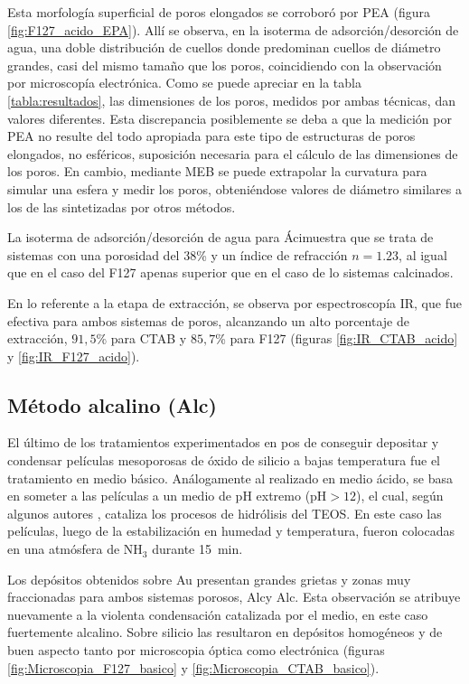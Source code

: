 		 Esta morfología superficial de poros elongados se corroboró por PEA (figura \ref{fig:F127_acido_EPA}). Allí se observa, en la isoterma de adsorción/desorción de agua, una doble distribución de cuellos donde predominan cuellos de diámetro grandes, casi del mismo tamaño que los poros, coincidiendo con la observación por microscopía electrónica.
		 Como se puede apreciar en la tabla \ref{tabla:resultados}, las dimensiones de los poros, medidos por ambas técnicas, dan valores diferentes. Esta discrepancia posiblemente se deba a que la medición por PEA no resulte del todo apropiada para este tipo de estructuras de poros elongados, no esféricos, suposición necesaria para el cálculo de las dimensiones de los poros. En cambio, mediante MEB se puede extrapolar la curvatura para simular una esfera y medir los poros, obteniéndose valores de diámetro similares a los de las \pdmF\space sintetizadas por otros métodos.

		 La isoterma de adsorción/desorción de agua para Áci\pdmC\space muestra que se trata de sistemas con una porosidad del 38\% y un índice de refracción $n=1.23$, al igual que en el caso del F127 apenas superior que en el caso de lo sistemas calcinados.
		
		 \pagebreak En lo referente a la etapa de extracción, se observa por espectroscopía IR, que fue efectiva para ambos sistemas de poros, alcanzando un alto porcentaje de extracción, $91,5$\% para CTAB y $85,7$\% para F127 (figuras \ref{fig:IR_CTAB_acido} y \ref{fig:IR_F127_acido}).  	
				
	 \subsection{Método alcalino (Alc)}

	 	 El último de los tratamientos experimentados en pos de conseguir depositar y condensar películas mesoporosas de óxido de silicio a bajas temperatura fue el tratamiento en medio básico. Análogamente al realizado en medio ácido, se basa en someter a las películas a un medio de pH extremo (pH$>12$), el cual, según algunos autores \cite{Soler-Illia2011,Huo1996,Ichinose2002,GonzalezSolveyra2017}, cataliza los procesos de hidrólisis del TEOS. En este caso las películas, luego de la estabilización en humedad y temperatura, fueron colocadas en una atmósfera de NH$_3$ durante \SI{15}{\minute}. 

		 Los depósitos obtenidos sobre Au presentan grandes grietas y zonas muy fraccionadas para ambos sistemas porosos, Alc\pdmF\space y Alc\pdmC. Esta observación se atribuye nuevamente a la violenta condensación catalizada por el medio, en este caso fuertemente alcalino. Sobre silicio las \pdm\space resultaron en depósitos homogéneos y de buen aspecto tanto por microscopia óptica como electrónica (figuras \ref{fig:Microscopia_F127_basico} y \ref{fig:Microscopia_CTAB_basico}).

